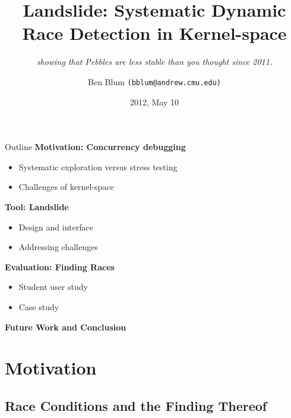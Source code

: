 \documentclass[xcolor=dvipsnames]{beamer}
\title[Landslide]{{\bf Landslide: Systematic Dynamic Race Detection in Kernel-space}}
\subtitle[]{ {\em showing that Pebbles are less stable than you thought since 2011.}}
\author[Ben Blum]{Ben Blum \texttt{(bblum@andrew.cmu.edu)}}
\institute[CMU]{Carnegie Mellon University}
\date[]{2012, May 10}
\begin{document}
\normalem
\begin{frame}
	\titlepage
\end{frame}


\newcommand\linegap{\vspace{0.2in}}
\newcommand\breakslide[1]{\begin{frame}{} \begin{center} #1 \end{center} \end{frame}}
\newcommand\related[1]{\textsuperscript{\em [#1]}}

\begin{frame}{Outline}
	\textbf{Motivation: Concurrency debugging}
	\begin{itemize}
		\item Systematic exploration versus stress testing
		\item Challenges of kernel-space
	\end{itemize}
	\linegap

	{\bf Tool: Landslide}
	\begin{itemize}
		\item Design and interface
		\item Addressing challenges
	\end{itemize}
	\linegap

	{\bf Evaluation: Finding Races}
	\begin{itemize}
		\item Student user study
		\item Case study
	\end{itemize}
	\linegap

	{\bf Future Work and Conclusion}
\end{frame}

\section{Motivation}

\subsection{Race Conditions and the Finding Thereof}
\end{document}
